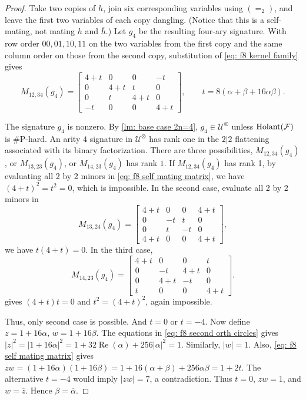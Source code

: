 \begin{proof}
Take two copies of $h$, join six corresponding variables using $(=_2)$,
and leave the first two variables of each copy dangling.  
(Notice that this is a self-mating, not mating $h$ and $\overline{h}$.)
Let $g_4$ be the
resulting four-ary signature.  With row order $00,01,10,11$ on the two
variables from the first copy and the same column order on those from the
second copy, substitution of \eqref{eq: f8 kernel family} gives
\begin{equation}\label{eq: f8 self mating matrix}
     M_{12,34}(g_4)=
     \begin{bmatrix}
     4+t&0&0&-t\\
     0&4+t&t&0\\
     0&t&4+t&0\\
     -t&0&0&4+t
     \end{bmatrix},\qquad t=8(\alpha+\beta+16\alpha\beta).
\end{equation}


The signature $g_4$ is nonzero.  By \cref{lm: base case 2n=4},  $g_4\in\mathcal U^{\otimes}$ unless $\operatorname{Holant}(\mathcal{F})$ is \#P-hard. 
An arity $4$ signature in $\mathcal U^{\otimes}$ has rank one in the $2|2$ flattening associated with its binary factorization. 
There are three possibilities, $M_{12,34}(g_4)$, or $M_{13,23}(g_4)$, or $M_{14,23}(g_4)$ has rank $1.$  
If $M_{12,34}(g_4)$ has rank 1, by evaluating all 2 by 2 minors in \eqref{eq: f8 self mating matrix}, we have $(4+t)^2=t^2=0$, which is impossible.
In the second case, evaluate all 2 by 2 minors in
    \[M_{13,24}(g_4)
    =
    \begin{bmatrix}
    4+t&0&0&4+t\\
    0&-t&t&0\\
    0&t&-t&0\\
    4+t&0&0&4+t
    \end{bmatrix},\]
we have $t(4+t)=0$.  
In the third case, 
    \[M_{14,23}(g_4)=
    \begin{bmatrix}
    4+t&0&0&t\\
    0&-t&4+t&0\\
    0&4+t&-t&0\\
    t&0&0&4+t
    \end{bmatrix}.\]
gives $(4+t)t=0$ and $t^2=(4+t)^2$, again impossible.

Thus, only second case is possible.
And $t=0$ or $t=-4.$
Now define
\(
 z=1+16\alpha,\, w=1+16\beta.
\)
The equations in \eqref{eq: f8 second orth circles} gives 
\(
|z|^2
=|1+16\alpha|^2
=1+32\operatorname{Re}(\alpha)+256|\alpha|^2
=1.
\)
Similarly, $|w|=1.$
Also, \eqref{eq: f8 self mating matrix} gives
\(
zw=(1+16\alpha)(1+16\beta)
=1+16(\alpha+\beta)+256\alpha\beta=1+2t.
\)
The alternative $t=-4$ would imply $|zw|=7$, a contradiction.
Thus $t=0$, $zw=1$, and $w=\overline z$. 
Hence
$\beta=\overline\alpha$.


\end{proof}
